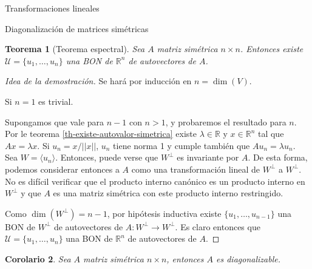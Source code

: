 \documentclass[a4paper,12pt,twoside,spanish,reqno]{amsbook}
\numberwithin{equation}{section}
\newtheorem{teorema}{Teorema}[section]
\newtheorem{corolario}[teorema]{Corolario}
\theoremstyle{definition}
\theoremstyle{remark}
\newcommand{\la}{\langle}
\newcommand{\ra}{\rangle}
\newcommand{\R}{\mathbb R}
\begin{document}
\begin{chapter}{Transformaciones lineales}
\begin{section}{Diagonalización de matrices simétricas}
    \begin{teorema}[Teorema espectral] Sea $A$ matriz simétrica $n \times n$. Entonces existe $\mathcal{U} = \{u_1,\ldots,u_n\}$ una BON de $\R^n$ de autovectores de $A$.
    \end{teorema}
    \begin{proof}[Idea de la demostración]		
        Se hará por inducción en $n= \dim(V)$.
        
        Si $n=1$ es trivial. 
        
        Supongamos que vale  para $n-1$ con $n >1$, y  probaremos el resultado para $n$. Por le teorema  \ref{th-existe-autovalor-simetrica} existe $\lambda \in \R$ y $x \in \R^n$ tal que $Ax = \lambda x$. Si $u_n = x/||x||$, $u_n$ tiene norma 1 y  cumple también que $Au_n = \lambda u_n$. Sea $W =\la u_n \ra$. Entonces, puede verse que $W^\perp$ es invariante por $A$. De esta forma, podemos considerar entonces a  $A$ como una transformación lineal de $W^\perp$ a $W^\perp$. No es difícil verificar que el producto interno canónico es un producto interno en $W^\perp$ y que $A$ es una matriz simétrica con este producto interno restringido.  
        
        Como $\dim(W^\perp) = n-1$, por hipótesis inductiva existe   $\{u_1,\ldots,u_{n-1}\}$ una BON de $W^\perp$ de autovectores de $A: W^\perp \to W^\perp$. Es claro entonces que $\mathcal{U} = \{u_1,\ldots,u_n\}$  una BON de $\R^n$ de autovectores de $A$. 
    \end{proof}

    \begin{corolario}
         Sea $A$ matriz simétrica $n \times n$, entonces $A$ es diagonalizable.
    \end{corolario}



\end{section}
\end{chapter}
\end{document}
